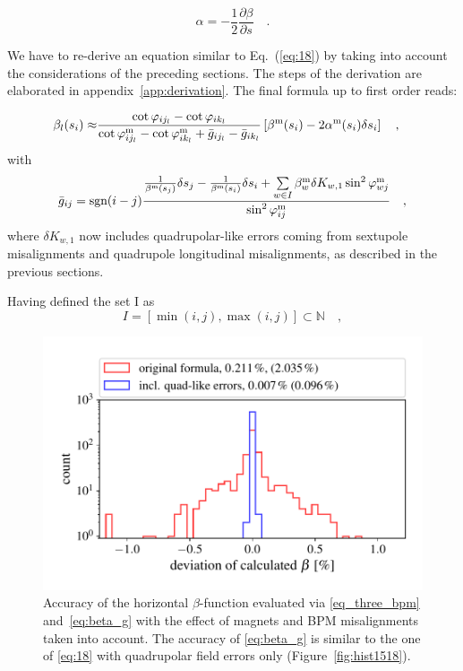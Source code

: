 \begin{equation}
\alpha = -\frac{1}{2}\frac{\partial \beta}{ \partial s}\quad .
\end{equation}

We have to re-derive an equation similar to Eq.~(\ref{eq:18}) by taking into account the considerations
of the preceding sections. The steps of the derivation are elaborated in appendix~\ref{app:derivation}.
The final formula up to first order reads:

\begin{align}
\beta_l(s_i) \approx& \frac{\cot\varphi_{i{j_l}} - \cot\varphi_{i{k_l}}}{\cot\varphi_{i{j_l}}^\text{m} - \cot\varphi_{i{k_l}}^\text{m} +\bar{g}_{i{j_l}} - \bar{g}_{i{k_l}}} \left[\beta^\text{m}(s_i) - 2 \alpha^\text{m}(s_i) \delta s_i\right] \quad ,
\label{eq:beta_g}
\end{align}
with 
\begin{equation}
\bar{g}_{ij} = \text{sgn}(i-j)\dfrac{ \frac{1}{\beta^\text{m}(s_j)}\delta s_j - \frac{1}{\beta^\text{m}(s_i)}\delta s_i +
\sum\limits_{w \in I}\beta_w^\text{m}\delta K_{w,1}\sin^2\varphi_{wj}^\text{m}}{\sin^2\varphi_{ij}^\text{m}}\quad ,
\label{eq:g_ij}
\end{equation} 
where $\delta K_{w,1} $ now includes quadrupolar-like errors coming from sextupole misalignments and
quadrupole longitudinal misalignments, as described in the previous sections. 

Having defined the set I as
 \begin{equation}
 I = \left[\min(i,j), \max(i,j)\right] \subset \mathbb{N}\quad ,
 \end{equation}

\begin{figure}
	\centering
  \includegraphics[width=.7\linewidth]{hist1518_EVERYTHING_01}
    \caption{Accuracy of the horizontal $\beta$-function evaluated via \eqref{eq_three_bpm} and~\eqref{eq:beta_g} with the effect of magnets and BPM misalignments taken into account. The accuracy of
 \eqref{eq:beta_g} is similar to the one of \eqref{eq:18} with quadrupolar field errors only (Figure~\ref{fig:hist1518}).}
	\label{fig:hist1518_with_everything}
\end{figure}

